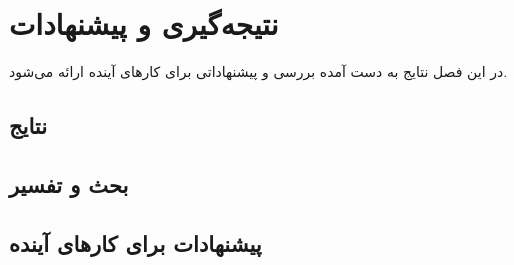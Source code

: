 \chapter{نتیجه‌گیری و پیشنهادات}
\label{ch:conclusion}

در این فصل نتایج به دست آمده بررسی و پیشنهاداتی برای کارهای آینده ارائه می‌شود.

\section{نتایج}
\label{sec:ch3-results}


\section{بحث و تفسیر}
\label{sec:ch3-discussion}


\section{پیشنهادات برای کارهای آینده}
\label{sec:ch3-future}


